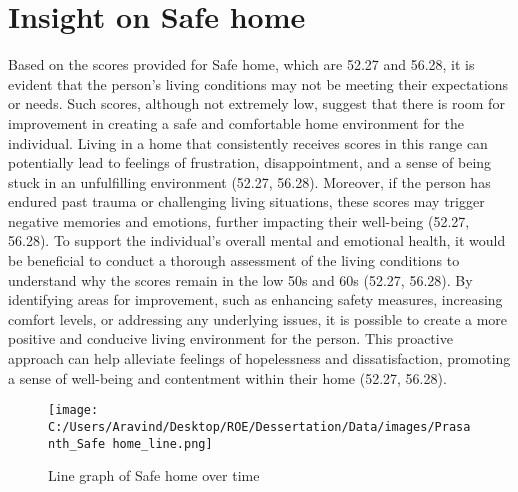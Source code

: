 \documentclass[10pt, a4paper]{article}%
\begin{document}
\section{Insight on Safe home}%
\label{sec:InsightonSafehome}%
Based on the scores provided for Safe home, which are 52.27 and 56.28, it is evident that the person's living conditions may not be meeting their expectations or needs. Such scores, although not extremely low, suggest that there is room for improvement in creating a safe and comfortable home environment for the individual. Living in a home that consistently receives scores in this range can potentially lead to feelings of frustration, disappointment, and a sense of being stuck in an unfulfilling environment (52.27, 56.28). Moreover, if the person has endured past trauma or challenging living situations, these scores may trigger negative memories and emotions, further impacting their well{-}being (52.27, 56.28).\newline%
\newline%
To support the individual's overall mental and emotional health, it would be beneficial to conduct a thorough assessment of the living conditions to understand why the scores remain in the low 50s and 60s (52.27, 56.28). By identifying areas for improvement, such as enhancing safety measures, increasing comfort levels, or addressing any underlying issues, it is possible to create a more positive and conducive living environment for the person. This proactive approach can help alleviate feelings of hopelessness and dissatisfaction, promoting a sense of well{-}being and contentment within their home (52.27, 56.28).%


\begin{figure}[H]%
\centering%
\texttt{[image: C:/Users/Aravind/Desktop/ROE/Dessertation/Data/images/Prasanth\_Safe home\_line.png]}%
\caption{Line graph of Safe home over time}%
\end{figure}

%
\end{document}
